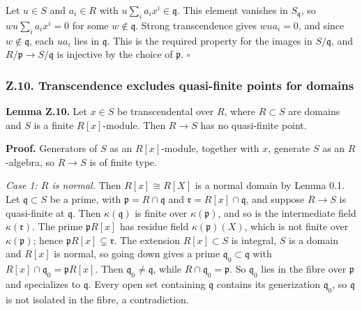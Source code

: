 \documentclass[11pt]{article}
\begin{document}
Let \(u\in S\) and \(a_i\in R\) with \(u\sum_ia_ix^i\in\mathfrak q\).
This element vanishes in \(S_{\mathfrak q}\), so \(wu\sum_ia_ix^i=0\)
for some \(w\notin\mathfrak q\). Strong transcendence gives \(wua_i=0\),
and since \(w\notin\mathfrak q\), each \(ua_i\) lies in \(\mathfrak q\).
This is the required property for the images in \(S/\mathfrak q\), and
\(R/\mathfrak p\to S/\mathfrak q\) is injective by the choice of
\(\mathfrak p\). \(\square\)

\subsubsection{Z.10. Transcendence excludes quasi-finite points for
domains}\label{z.10.-transcendence-excludes-quasi-finite-points-for-domains}

\textbf{Lemma Z.10.} Let \(x\in S\) be transcendental over \(R\), where
\(R\subset S\) are domains and \(S\) is a finite \(R[x]\)-module. Then
\(R\to S\) has no quasi-finite point.

\textbf{Proof.} Generators of \(S\) as an \(R[x]\)-module, together with
\(x\), generate \(S\) as an \(R\)-algebra, so \(R\to S\) is of finite
type.

\emph{Case 1: \(R\) is normal.} Then \(R[x]\cong R[X]\) is a normal
domain by Lemma 0.1. Let \(\mathfrak q\subset S\) be a prime, with
\(\mathfrak p=R\cap\mathfrak q\) and
\(\mathfrak r=R[x]\cap\mathfrak q\), and suppose \(R\to S\) is
quasi-finite at \(\mathfrak q\). Then \(\kappa(\mathfrak q)\) is finite
over \(\kappa(\mathfrak p)\), and so is the intermediate field
\(\kappa(\mathfrak r)\). The prime \(\mathfrak pR[x]\) has residue field
\(\kappa(\mathfrak p)(X)\), which is not finite over
\(\kappa(\mathfrak p)\); hence \(\mathfrak pR[x]\subsetneq\mathfrak r\).
The extension \(R[x]\subset S\) is integral, \(S\) is a domain and
\(R[x]\) is normal, so going down gives a prime
\(\mathfrak q_0\subset\mathfrak q\) with
\(R[x]\cap\mathfrak q_0=\mathfrak pR[x]\). Then
\(\mathfrak q_0\ne\mathfrak q\), while
\(R\cap\mathfrak q_0=\mathfrak p\). So \(\mathfrak q_0\) lies in the
fibre over \(\mathfrak p\) and specializes to \(\mathfrak q\). Every
open set containing \(\mathfrak q\) contains its generization
\(\mathfrak q_0\), so \(\mathfrak q\) is not isolated in the fibre, a
contradiction.
\end{document}
